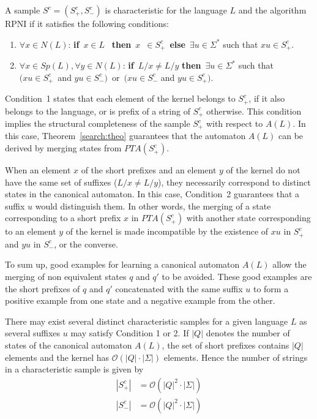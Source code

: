 \begin{definition}
A sample $S^c=(S_{+}^c,S_{-}^c)$ is characteristic for the language $L$ and the algorithm RPNI if it satisfies the following conditions: 
\begin{enumerate}
\item  $\forall x\in N(L)$: \textbf{if}\ $x\in L$ \ \textbf{then}\ $x$\ $\in S_{+}^c$\ \textbf{else}\ $\exists u\in \Sigma ^{*}$ such that $xu\in S_{+}^c$.
\item  $\forall x\in Sp(L),\forall y\in N(L)$: \textbf{if}\ $L/x\neq L/y$ \textbf{then}\ $\exists u\in \Sigma ^{*}$ such that \\$(xu\in S_{+}^c$\ and $yu\in S_{-}^c)$\ or\ $(xu\in S_{-}^c$ and $yu\in S_{+}^c)$.
\end{enumerate}
\label{Characteristic:Sample}
\end{definition}

Condition~1 states that each element of the kernel belongs to $S_{+}^c$, if it also belongs to the language, or is prefix of a string of $S_{+}^c$ otherwise. This condition implies the structural completeness of the sample $S_{+}^c$ with respect to $A(L)$. In this case, Theorem~\ref{search:theo} guarantees that the automaton $A(L)$ can be derived by merging states from $PTA(S_{+}^c)$. 

When an element $x$ of the short prefixes and an element $y$ of the kernel do not have the same set of suffixes ($L/x\neq L/y$), they necessarily correspond to distinct states in the canonical automaton. In this case, Condition~2 guarantees that a suffix $u$ would distinguish them. In other words, the merging of a state corresponding to a short prefix $x$ in $PTA(S_{+}^c)$ with another state corresponding to an element $y$ of the kernel is made incompatible by the existence of $xu$ in $S_{+}^c$ and $yu $ in $S_{-}^c$, or the converse.

To sum up, good examples for learning a canonical automaton $A(L)$ allow the merging of non equivalent states $q$ and $q'$ to be avoided. These good examples are the short prefixes of $q$ and $q'$ concatenated with the same suffix $u$ to form a positive example from one state and a negative example from the other. 

There may exist several distinct characteristic samples for a given language $L$ as several suffixes $u$ may satisfy Condition 1 or 2. If $|Q|$ denotes the number of states of the canonical automaton $A(L)$, the set of short prefixes contains $|Q|$ elements and the kernel has $\mathcal{O}(|Q|\cdot |\Sigma |)$ elements. Hence the number of strings in a characteristic sample is given by 
\begin{align*}
|S_{+}^c| &= \mathcal{O}(|Q|^2\cdot |\Sigma |) \\
|S_{-}^c| &= \mathcal{O}(|Q|^2\cdot |\Sigma |)
\end{align*}

